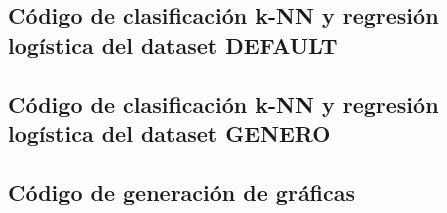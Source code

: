 \documentclass[sigconf,authorversion,nonacm]{acmart}
\begin{document}
\clearpage

\appendix

\lstset{style=customstyle}

\begin{figure*}
 \section{Código de clasificación k-NN y regresión logística del dataset DEFAULT}
  \label{appendix:nn_default}
  
\end{figure*}

\begin{figure*}
  \section{Código de clasificación k-NN  y regresión logística del dataset GENERO}
  \label{appendix:nn_genero}
  
\end{figure*}

\begin{figure*}
  
\end{figure*}

\begin{figure*}
  \section{Código de generación de gráficas}
  \label{appendix:graphs}
  
\end{figure*}

\begin{figure*}
  
\end{figure*}
\end{document}
